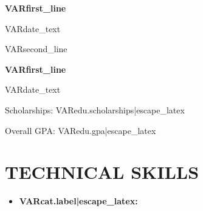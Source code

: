 \documentclass[10pt,letterpaper]{article}
\newcommand{\entryvspace}{\vspace{1pt}}
\newcommand{\sectionvspace}{\vspace{3pt}}
\newcommand{\entryvspace}{\vspace{5pt}}
\newcommand{\sectionvspace}{\vspace{5pt}}
\newcommand{\resumeEducation}[2]{
  \noindent
  \begin{minipage}[t]{0.7\textwidth}
    \textbf{#1}
  \end{minipage}
  \hfill
  \begin{minipage}[t]{0.25\textwidth}
    \raggedleft #2
  \end{minipage}
  \vspace{1pt}
}
\newcommand{\resumeEducationSplit}[3]{
  \noindent
  \begin{minipage}[t]{0.7\textwidth}
    \textbf{#1}
  \end{minipage}
  \hfill
  \begin{minipage}[t]{0.25\textwidth}
    \raggedleft #2
  \end{minipage}
  \par\noindent #3
  \vspace{1pt}
}
\begin{document}
\resumeEducationSplit{VAR{first_line}}{VAR{date_text}}{VAR{second_line}}
\resumeEducation{VAR{first_line}}{VAR{date_text}}

\noindent Scholarships: VAR{edu.scholarships|escape_latex}

\noindent Overall GPA: VAR{edu.gpa|escape_latex}
\entryvspace

\section*{TECHNICAL SKILLS}
\begin{itemize}
  \item \textbf{VAR{cat.label|escape_latex}:} %
\end{itemize}
\sectionvspace

\end{document}
